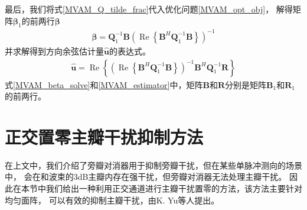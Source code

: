 \documentclass[master]{thesis-uestc}
\begin{document}
最后，我们将式\eqref{MVAM_Q_tilde_frac}代入优化问题\eqref{MVAM_opt_obj}，
解得矩阵$\bm{\beta}_1$的前两行$\bm{\beta}$
\begin{equation}\label{MVAM_beta_solve}
    \begin{aligned}
        \bm{\beta} = \bm{Q}^{-1}_1\bm{B}
        \left(\operatorname{Re}\left\{\bm{B}^H\bm{Q}^{-1}_1\bm{B}\right\}\right)^{-1}
    \end{aligned}
\end{equation}
并求解得到方向余弦估计量$\hat{\bm{u}}$的表达式。
\begin{equation}\label{MVAM_estimator}
    \begin{aligned}
        \hat{\bm{u}} = \operatorname{Re}
        \left\{
            \left(\operatorname{Re}\left\{\bm{B}^H\bm{Q}^{-1}_1\bm{B}\right\}\right)^{-1}
            \bm{B}^H\bm{Q}^{-1}_1\bm{R}
        \right\}
    \end{aligned}
\end{equation}
式\eqref{MVAM_beta_solve}和\eqref{MVAM_estimator}中，矩阵$\bm{B}$和$\bm{R}$分别是矩阵$\bm{B}_1$和$\bm{R}_1$的前两行。

\section{正交置零主瓣干扰抑制方法}
在上文中，我们介绍了旁瓣对消器用于抑制旁瓣干扰，但在某些单脉冲测向的场景中，
会在和波束的3dB主瓣内存在强干扰，但旁瓣对消器无法处理主瓣干扰。
因此在本节中我们给出一种利用正交通道进行主瓣干扰置零的方法，该方法主要针对均匀面阵，
可以有效的抑制主瓣干扰，由K. Yu等人提出\cite{Yu_01}。
\end{document}
